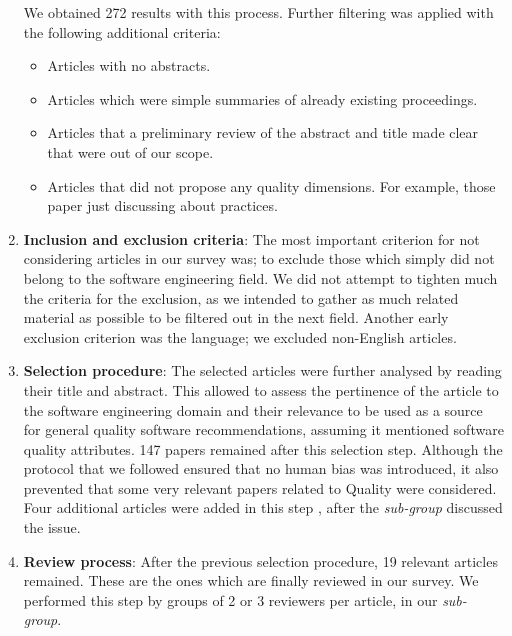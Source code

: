 \begin{enumerate}
    We obtained 272 results with this process. Further filtering was applied with the following additional criteria:
    \begin{itemize}
        \item Articles with no abstracts.
        \item Articles which were simple summaries of already existing proceedings.
        \item Articles that a preliminary review of the abstract and title made clear that were out of our scope.
        \item Articles that did not propose any quality dimensions. For example, those paper just discussing about practices.
    \end{itemize}

    \item \textbf{Inclusion and exclusion criteria}: The most important criterion for not considering articles in our survey was; to exclude those which simply did not belong to the software engineering field. We did not attempt to tighten much the criteria for the exclusion, as we intended to gather as much related material as possible to be filtered out in the next field. Another early exclusion criterion was the language; we excluded non-English articles.

    \item \textbf{Selection procedure}: The selected articles were further analysed by reading their title and abstract. This allowed to assess the pertinence of the article to the software engineering domain and their relevance to be used as a source for general quality software recommendations, assuming it mentioned software quality attributes. 147 papers remained after this selection step. Although the protocol that we followed ensured that no human bias was introduced, it also prevented that some very relevant papers related to Quality were considered. Four additional articles were added in this step \cite{orviz_set_2017,orviz_fernandez_eosc-synergy_2020,raymond_software_2013,shepherdson_cessda_2019}, after the \textit{sub-group} discussed the issue.

    \item \textbf{Review process}: After the previous selection procedure, 19 relevant articles remained. These are the ones which are finally reviewed in our survey. We performed this step by groups of 2 or 3 reviewers per article, in our \textit{sub-group}.
\end{enumerate}

